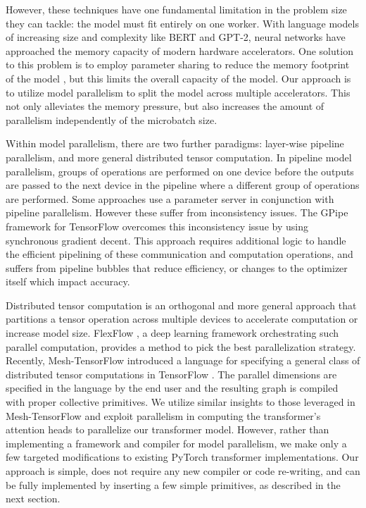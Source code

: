 \documentclass{article}
\begin{document}
However, these techniques have one fundamental limitation in the problem size they can tackle: the model must fit entirely on one worker. With language models of increasing size and complexity like BERT and GPT-2, neural networks have approached the memory capacity of modern hardware accelerators. One solution to this problem is to employ parameter sharing to reduce the memory footprint of the model \cite{ALBERT2019}, but this limits the overall capacity of the model. Our approach is to utilize model parallelism to split the model across multiple accelerators. This not only alleviates the memory pressure, but also increases the amount of parallelism independently of the microbatch size.

Within model parallelism, there are two further paradigms: layer-wise pipeline parallelism, and more general distributed tensor computation. In pipeline model parallelism, groups of operations are performed on one device before the outputs are passed to the next device in the pipeline where a different group of operations are performed. Some approaches \cite{PipeDream2018, DualPipe2018} use a parameter server \cite{ParamServer2014} in conjunction with pipeline parallelism. However these suffer from inconsistency issues. The GPipe framework for TensorFlow \cite{GPipe} overcomes this inconsistency issue by using synchronous gradient decent. This approach requires additional logic to handle the efficient pipelining of these communication and computation operations, and suffers from pipeline bubbles that reduce efficiency, or changes to the optimizer itself which impact accuracy.

Distributed tensor computation is an orthogonal and more general approach that partitions a tensor operation across multiple devices to accelerate computation or increase model size. FlexFlow \cite{FlexFlow2018}, a deep learning framework orchestrating such parallel computation, provides a method to pick the best parallelization strategy. Recently, Mesh-TensorFlow \cite{mesh_tf} introduced a language for specifying a general class of distributed tensor computations in TensorFlow \cite{tensorflow2015-whitepaper}. The parallel dimensions are specified in the language by the end user and the resulting graph is compiled with proper collective primitives. We utilize similar insights to those leveraged in Mesh-TensorFlow and exploit parallelism in computing the transformer's attention heads to parallelize our transformer model. However, rather than implementing a framework and compiler for model parallelism, we make only a few targeted modifications to existing PyTorch transformer implementations. Our approach is simple, does not require any new compiler or code re-writing, and can be fully implemented by inserting a few simple primitives, as described in the next section.
\end{document}
